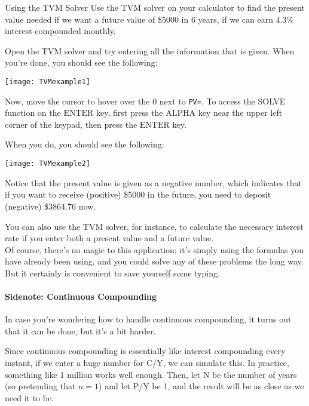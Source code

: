 \begin{example}[https://www.youtube.com/watch?v=sUlHfj7at0M&list=PLfmpjsIzhztsZtnb7HnXrQ8SLoiOCIcAM&index=24]{Using the TVM Solver}
Use the TVM solver on your calculator to find the present value needed if we want a future value of \$5000 in 6 years, if we can earn 4.3\% interest compounded monthly.

\sol
Open the TVM solver and try entering all the information that is given.  When you're done, you should see the following:
\begin{center}
\texttt{[image: TVMexample1]}
\end{center}

Now, move the cursor to hover over the 0 next to \texttt{PV=}.  To access the SOLVE function on the $\boxed{\textrm{ENTER}}$ key, first press the $\boxed{\textrm{ALPHA}}$ key near the upper left corner of the keypad, then press the $\boxed{\textrm{ENTER}}$ key.

When you do, you should see the following:
\begin{center}
\texttt{[image: TVMexample2]}
\end{center}

Notice that the present value is given as a negative number, which indicates that if you want to receive (positive) \$5000 in the future, you need to deposit (negative) \$3864.76 now.
\end{example}

You can also use the TVM solver, for instance, to calculate the necessary interest rate if you enter both a present value and a future value.\\

Of course, there's no magic to this application; it's simply using the formulas you have already been using, and you could solve any of these problems the long way.  But it certainly is convenient to save yourself some typing.

\paragraph{Sidenote: Continuous Compounding} In case you're wondering how to handle continuous compounding, it turns out that it can be done, but it's a bit harder.

Since continuous compounding is essentially like interest compounding every instant, if we enter a huge number for C/Y, we can simulate this.  In practice, something like 1 million works well enough.  Then, let N be the number of years (so pretending that $n=1$) and let P/Y be 1, and the result will be as close as we need it to be.
\vfill
\pagebreak

